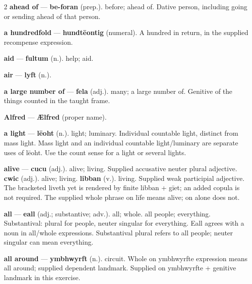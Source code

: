 \begin{multicols}{2}
\textbf{ahead of} — \textbf{be-foran} (prep.). before; ahead of. Dative person, including going or sending ahead of that person.\par
\textbf{a hundredfold} — \textbf{hundtēontig} (numeral). A hundred in return, in the supplied recompense expression.\par
\textbf{aid} — \textbf{fultum} (n.). help; aid.\par
\textbf{air} — \textbf{lyft} (n.).\par
\textbf{a large number of} — \textbf{fela} (adj.). many; a large number of. Genitive of the things counted in the taught frame.\par
\textbf{Alfred} — \textbf{Ælfred} (proper name).\par
\textbf{a light} — \textbf{lēoht} (n.). light; luminary. Individual countable light, distinct from mass light. Mass light and an individual countable light/luminary are separate uses of lēoht. Use the count sense for a light or several lights.\par
\textbf{alive} — \textbf{cucu} (adj.). alive; living. Supplied accusative neuter plural adjective. \textbf{cwic} (adj.). alive; living. \textbf{libban} (v.). living. Supplied weak participial adjective. The bracketed liveth yet is rendered by finite libban + gīet; an added copula is not required. The supplied whole phrase on līfe means alive; on alone does not.\par
\textbf{all} — \textbf{eall} (adj.; substantive; adv.). all; whole. all people; everything. Substantival: plural for people, neuter singular for everything. Eall agrees with a noun in all/whole expressions. Substantival plural refers to all people; neuter singular can mean everything.\par
\textbf{all around} — \textbf{ymbhwyrft} (n.). circuit. Whole on ymbhwyrfte expression means all around; supplied dependent landmark. Supplied on ymbhwyrfte + genitive landmark in this exercise.\par

\end{multicols}
